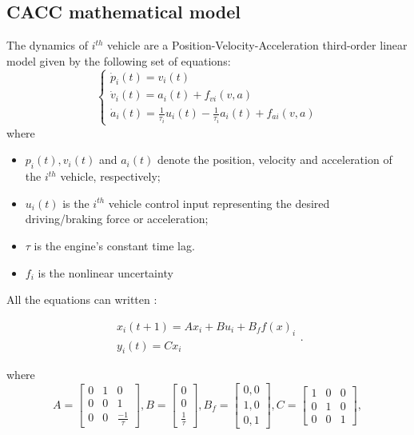 \documentclass[letterpaper, 10pt, conference]{ieeeconf}  %
\begin{document}
\subsection{CACC mathematical model}
The dynamics of $i^{th}$ vehicle are a Position-Velocity-Acceleration third-order linear model given by the following set of equations:
\begin{equation}\label{eq_1}
      \left\{ \begin{array}{l}
        \dot{p}_i(t) =v_i(t) \\
        \dot{v}_i(t)  =a_i(t) + f_{vi}(v,a) \\
        \dot{a}_i(t)  =\frac{1}{\tau_i} u_i(t)-\frac{1}{\tau_i} a_i(t) + f_{ai}(v,a)  \end{array}  \right.
\end{equation}  
where
\begin{itemize}
\item $p_i(t), v_i(t)$ and $a_i(t)$ denote the position, velocity and
acceleration of the $i^{th}$  vehicle, respectively;
\item $u_i(t)$ is the $i^{th}$ vehicle control input representing the desired
driving/braking force or acceleration;
 \item $\tau$ is the engine's constant time lag. 
 \item $f_i$ is the nonlinear uncertainty 
 \end{itemize}

 All the equations can written :

\begin{equation}\label{CACC}
       \begin{array}{l}
        {x_i}(t+1)=A x_i + B  u_i + B_f f(x)_i  \\
        y_{i}(t) = Cx_{i}\end{array} .
\end{equation}  

where 
\begin{equation*}
        A  =\begin{bmatrix}
        0 & 1 & 0 \\
        0 & 0 & 1 \\
        0 & 0 & \frac{-1}{\tau}
          \end{bmatrix},
        B =\begin{bmatrix}
        0 \\
        0 \\
        \frac{1}{\tau}
          \end{bmatrix}, 
        B_f =\begin{bmatrix}
        0,0 \\
        1,0 \\
        0,1
          \end{bmatrix},
        C =\begin{bmatrix}
        1 & 0 & 0 \\
        0 & 1 & 0 \\
        0 & 0 & 1
          \end{bmatrix}, 
\end{equation*}
\end{document}
